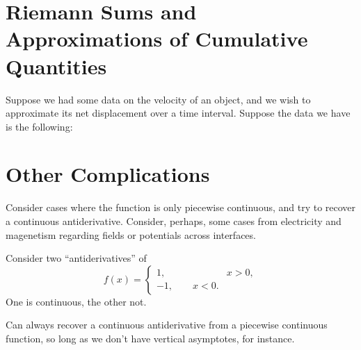 

\section{Riemann Sums and Approximations of Cumulative Quantities}

Suppose we had some data on the velocity of an object, and
we wish to approximate its net displacement over a time interval.
Suppose the data we have is the following:



\section{Other Complications}
Consider cases where the function is only piecewise continuous,
and try to recover a continuous antiderivative.
Consider, perhaps, some cases from electricity and magenetism
regarding fields or potentials across interfaces.

Consider two ``antiderivatives'' of 
$$f(x)=\left\{\begin{aligned}1,\qquad&x>0,\\
                           -1,\qquad x<0.\end{aligned}\right.
$$
One is continuous, the other not.

Can always recover a continuous antiderivative from a piecewise continuous
function, so long as we don't have vertical asymptotes, for instance.
